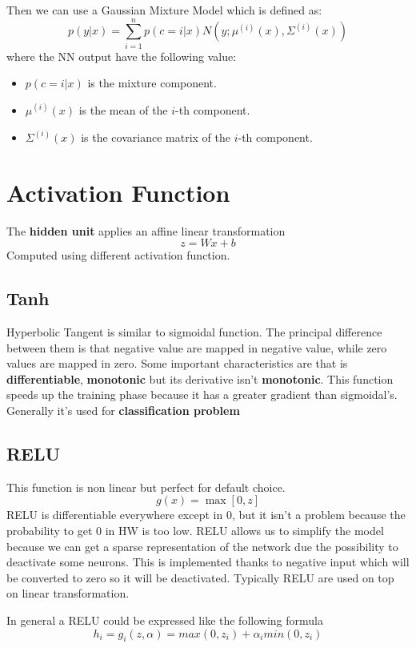 Then we can use a Gaussian Mixture Model which is defined as:
\begin{equation}
    p(y|x) = \sum_{i=1}^n p(c= i|x) N(y; \mu^{(i)}(x), \Sigma^{(i)}(x))
\end{equation}
where the NN output have the following value:
\begin{itemize}
    \item $p(c=i|x)$ is the mixture component.
    \item $\mu^{(i)}(x)$ is the mean of the $i$-th component.
    \item $\Sigma^{(i)}(x)$ is the covariance matrix of the $i$-th component.
\end{itemize}

\section{Activation Function}
The \textbf{hidden unit} applies an affine linear transformation 
$$z = Wx +b$$
Computed using different activation function. 

\subsection{Tanh}
Hyperbolic Tangent is similar to sigmoidal function. The principal difference between
them is that negative value are mapped in negative value, while zero values are mapped 
in zero. Some important characteristics are that is \textbf{differentiable}, \textbf{monotonic}
but its derivative isn't \textbf{monotonic}. This function speeds up the training 
phase because it has a greater gradient than sigmoidal's. Generally it's used for \textbf{classification 
 problem}

\subsection{RELU}
This function is non linear but perfect for default choice.
$$g(x)= \max[0,z]$$
RELU is differentiable everywhere except in $0$, but it isn't a problem because the 
probability to get $0$ in HW is too low. RELU allows us to simplify the model because
we can get a sparse representation of the network due the possibility to deactivate 
some neurons. This is implemented thanks to negative input which will be converted to 
zero so it will be deactivated. Typically RELU are used on top on linear transformation. 

In general a RELU could be expressed like the following formula
$$h_i = g_i(z,\alpha) = max(0,z_i) + \alpha_i min(0, z_i)$$

